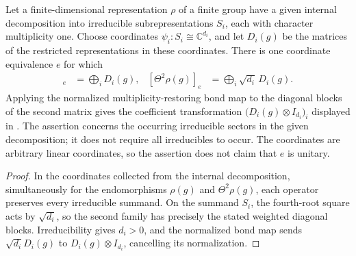 \begin{lemma}%
    \label{thm:peps_theta_bond_coordinates}
    \leanok
    Let a finite-dimensional representation $\rho$ of a finite group have a
    given internal decomposition into irreducible subrepresentations $S_i$,
    each with character multiplicity one. Choose coordinates
    $\psi_i:S_i\cong\mathbb C^{d_i}$, and let $D_i(g)$ be the matrices of
    the restricted representations in these coordinates.
    There is one coordinate equivalence $e$ for which
    \begin{align}
        [\rho(g)]_e         & =\bigoplus_iD_i(g),             &
        [\Theta^2\rho(g)]_e & =\bigoplus_i\sqrt{d_i}\,D_i(g).
    \end{align}
    Applying the normalized multiplicity-restoring bond map to the
    diagonal blocks of the second matrix gives the coefficient transformation
    $\bigl(D_i(g)\otimes I_{d_i}\bigr)_i$ displayed in
    \cite[Section~7]{Schuch2010PEPS}.
    The assertion concerns the occurring irreducible sectors in the given
    decomposition; it does not require all irreducibles to occur.
    The coordinates are arbitrary linear coordinates, so the assertion
    does not claim that $e$ is unitary.
\end{lemma}

\begin{proof}\leanok
    In the coordinates collected from the internal decomposition, simultaneously
    for the endomorphisms $\rho(g)$ and $\Theta^2\rho(g)$, each operator
    preserves every irreducible summand. On the summand $S_i$, the
    fourth-root square acts by $\sqrt{d_i}$, so the second family has precisely
    the stated weighted diagonal blocks. Irreducibility gives $d_i>0$, and
    the normalized bond map sends
    $\sqrt{d_i}D_i(g)$ to $D_i(g)\otimes I_{d_i}$, cancelling its normalization.
\end{proof}
